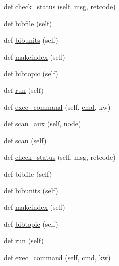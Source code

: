 \begin{DoxyCompactItemize}
\item 
def \hyperlink{classwaflib_1_1_tools_1_1tex_1_1tex_ac5e3e5ed9bae28652ceec355e87c041b}{check\+\_\+status} (self, msg, retcode)
\item 
def \hyperlink{classwaflib_1_1_tools_1_1tex_1_1tex_a84f06095e6adb078c76849aaad9caaa7}{bibfile} (self)
\item 
def \hyperlink{classwaflib_1_1_tools_1_1tex_1_1tex_adc9975ca42cc99bdfed2453d0501deb7}{bibunits} (self)
\item 
def \hyperlink{classwaflib_1_1_tools_1_1tex_1_1tex_a037e014ad6faffb9d86bce5a13038776}{makeindex} (self)
\item 
def \hyperlink{classwaflib_1_1_tools_1_1tex_1_1tex_a91f60e48f7933bde8c62a1108c408f84}{bibtopic} (self)
\item 
def \hyperlink{classwaflib_1_1_tools_1_1tex_1_1tex_a9ca231d8975e3c1d5d3c9e455f31f892}{run} (self)
\item 
def \hyperlink{classwaflib_1_1_tools_1_1tex_1_1tex_af3bd4c7abea22374fe7cb435022880cd}{exec\+\_\+command} (self, \hyperlink{sndfile__play_8m_adfc5ba7e22f5e4a6221c12a70503bef3}{cmd}, kw)
\item 
def \hyperlink{classwaflib_1_1_tools_1_1tex_1_1tex_abd3866cf63c379f3bdd3e1568f32182a}{scan\+\_\+aux} (self, \hyperlink{structnode}{node})
\item 
def \hyperlink{classwaflib_1_1_tools_1_1tex_1_1tex_a9a1611c5caf6c5ef3bf0efbcd7cdb0b4}{scan} (self)
\item 
def \hyperlink{classwaflib_1_1_tools_1_1tex_1_1tex_ac5e3e5ed9bae28652ceec355e87c041b}{check\+\_\+status} (self, msg, retcode)
\item 
def \hyperlink{classwaflib_1_1_tools_1_1tex_1_1tex_a84f06095e6adb078c76849aaad9caaa7}{bibfile} (self)
\item 
def \hyperlink{classwaflib_1_1_tools_1_1tex_1_1tex_adc9975ca42cc99bdfed2453d0501deb7}{bibunits} (self)
\item 
def \hyperlink{classwaflib_1_1_tools_1_1tex_1_1tex_a037e014ad6faffb9d86bce5a13038776}{makeindex} (self)
\item 
def \hyperlink{classwaflib_1_1_tools_1_1tex_1_1tex_a91f60e48f7933bde8c62a1108c408f84}{bibtopic} (self)
\item 
def \hyperlink{classwaflib_1_1_tools_1_1tex_1_1tex_a9ca231d8975e3c1d5d3c9e455f31f892}{run} (self)
\item 
def \hyperlink{classwaflib_1_1_tools_1_1tex_1_1tex_af3bd4c7abea22374fe7cb435022880cd}{exec\+\_\+command} (self, \hyperlink{sndfile__play_8m_adfc5ba7e22f5e4a6221c12a70503bef3}{cmd}, kw)

\end{DoxyCompactItemize}
